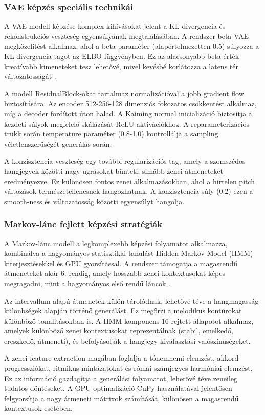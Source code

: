 \subsubsection{VAE képzés speciális technikái}
A VAE modell képzése komplex kihívásokat jelent a KL divergencia és rekonstrukciós veszteség egyensúlyának megtalálásában. A rendszer beta-VAE megközelítést alkalmaz, ahol a beta paraméter (alapértelmezetten 0.5) súlyozza a KL divergencia tagot az ELBO függvényben. Ez az alacsonyabb beta érték kreatívabb kimeneteket tesz lehetővé, mivel kevésbé korlátozza a latens tér változatosságát \cite{kingma2014auto, brunner2018midivae}.

A modell ResidualBlock-okat tartalmaz normalizációval a jobb gradient flow biztosítására. Az encoder 512-256-128 dimenziós fokozatos csökkentést alkalmaz, míg a decoder fordított úton halad. A Kaiming normal inicializáció biztosítja a kezdeti súlyok megfelelő skálázását ReLU aktivációkhoz. A reparameterizációs trükk során temperature paraméter (0.8-1.0) kontrollálja a sampling véletlenszerűségét generálás során.

A konzisztencia veszteség egy további regularizációs tag, amely a szomszédos hangjegyek közötti nagy ugrásokat bünteti, simább zenei átmeneteket eredményezve. Ez különösen fontos zenei alkalmazásokban, ahol a hirtelen pitch változások természetellenesnek hangozhatnak. A konzisztencia súly (0.2) ezen a smooth-ness és változatosság közötti egyensúlyt hangolja.

\subsubsection{Markov-lánc fejlett képzési stratégiák}
A Markov-lánc modell a legkomplexebb képzési folyamatot alkalmazza, kombinálva a hagyományos statisztikai tanulást Hidden Markov Model (HMM) kiterjesztésekkel és GPU gyorsítással. A rendszer támogatja a magasrendű átmeneteket akár 6. rendig, amely hosszabb zenei kontextusokat képes megragadni, mint a hagyományos első rendű láncok \cite{carvalho2019markov}.

Az intervallum-alapú átmenetek külön tárolódnak, lehetővé téve a hangmagasság-különbségek alapján történő generálást. Ez megőrzi a melodikus kontúrokat különböző tonalitásokban is. A HMM komponens 16 rejtett állapotot alkalmaz, amelyek különböző zenei kontextusokat reprezentálnak (stabil, emelkedő, ereszkedő, átmeneti), és befolyásolják a hangjegy kiválasztási valószínűségeket.

A zenei feature extraction magában foglalja a tónemnemi elemzést, akkord progressziókat, ritmikus mintázatokat és római számjegyes harmóniai elemzést. Ez az információ gazdagítja a generálási folyamatot, lehetővé téve zeneileg tudatos döntéseket. A GPU optimalizáció CuPy használatával jelentősen felgyorsítja a nagy átmeneti mátrixok számítását, különösen a magasrendű kontextusok esetében.

